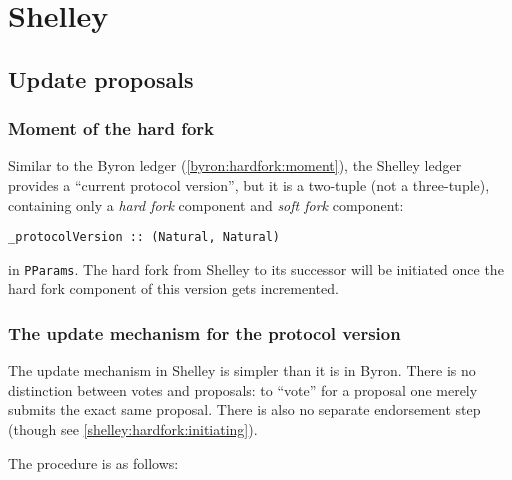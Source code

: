\chapter{Shelley}

\section{Update proposals}
\label{shelley:hardfork}

\subsection{Moment of the hard fork}
\label{shelley:hardfork:moment}

Similar to the Byron ledger (\cref{byron:hardfork:moment}), the Shelley ledger
provides a ``current protocol version'', but it is a two-tuple (not a
three-tuple), containing only a \emph{hard fork} component and \emph{soft fork}
component:
%
\begin{lstlisting}
_protocolVersion :: (Natural, Natural)
\end{lstlisting}
%
in \lstinline!PParams!. The hard fork from Shelley to its successor will be
initiated once the hard fork component of this version gets incremented.

\subsection{The update mechanism for the protocol version}

The update mechanism in Shelley is simpler than it is in Byron. There is no
distinction between votes and proposals: to ``vote'' for a proposal one merely
submits the exact same proposal. There is also no separate endorsement step
(though see \cref{shelley:hardfork:initiating}).

The procedure is as follows:

